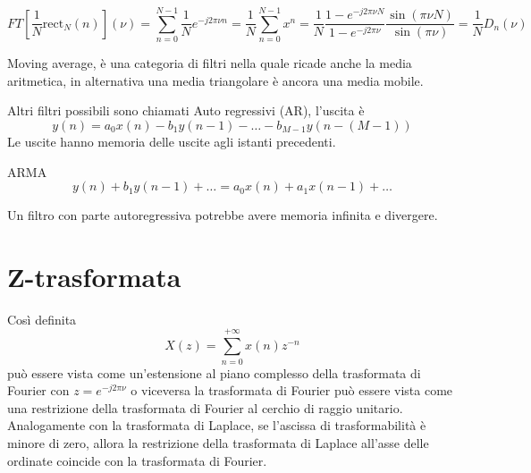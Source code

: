 $$
FT[\frac{1}{N}\text{rect}_N(n)](\nu) = \sum_{n=0}^{N-1} \frac{1}{N}e^{-j2\pi
\nu n} = \frac{1}{N} \sum_{n=0}^{N-1} x^n = \frac{1}{N} \frac{1-e^{-j2\pi
\nu N}}{1-e^{-j2\pi\nu}} \frac{\sin(\pi\nu N)}{\sin(\pi \nu)} = \frac{1}{N}
D_n(\nu)
$$


Moving average, è una categoria di filtri nella quale ricade anche la media
aritmetica, in alternativa una media triangolare è ancora una media mobile.

Altri filtri possibili sono chiamati Auto regressivi (AR), l'uscita è
$$
y(n) = a_0x(n) - b_1y(n-1) - \dots -b_{M-1} y(n-(M-1))
$$
Le uscite hanno memoria delle uscite agli istanti precedenti.

ARMA
$$
y(n) + b_1 y(n-1) + \dots  = a_0x(n) + a_1x(n-1) + \dots
$$

Un filtro con parte autoregressiva potrebbe avere memoria infinita e divergere.

\section{Z-trasformata}
Così definita
$$
X(z) = \sum_{n=0}^{+\infty} x(n)z^{-n}
$$
può essere vista come un'estensione al piano complesso della trasformata di
Fourier con $z = e^{-j2\pi \nu}$ o viceversa la trasformata di Fourier può
essere vista come una restrizione della trasformata di Fourier al cerchio di
raggio unitario.
Analogamente con la trasformata di Laplace, se l'ascissa di trasformabilità è
minore di zero, allora la restrizione della trasformata di Laplace all'asse
delle ordinate coincide con la trasformata di Fourier.



